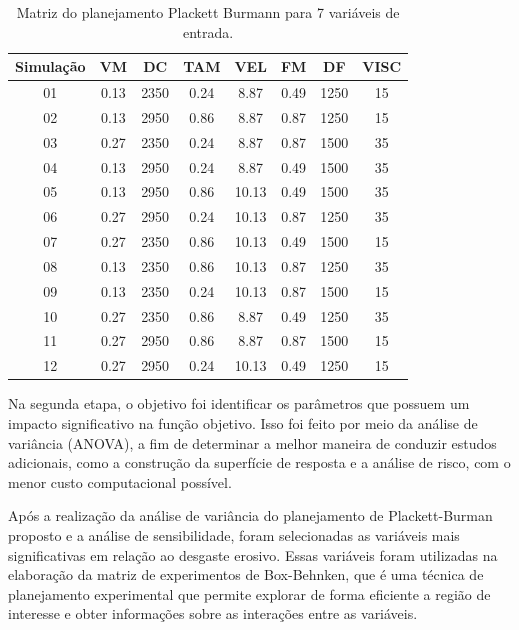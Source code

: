 \begin{table}[H] 
\caption{Matriz do planejamento Plackett Burmann para 7 variáveis de entrada.}
\begin{tabular*}{\textwidth}{@{\extracolsep{\stretch{1}}}*{8}{c}@{}}
\toprule
   Simulação &VM&	DC	&TAM	&VEL&	FM&	DF	&VISC\\
  \midrule
01 & 0.13 &	2350 &	0.24	& 8.87   &	0.49 &	1250 &	15 	\\
02 & 0.13 &	2950 &	0.86	& 8.87  &	0.87 &	1250 &	15 	\\
03 & 0.27 &	2350 &	0.24	& 8.87  &	0.87 &	1500 &	35   \\
04 & 0.13 &	2950&	0.24	& 8.87   &	0.49 &	1500 &	35    \\
05 & 0.13 &	2950 &	0.86	& 10.13  &	0.49 &	1500 &	35     \\
06 & 0.27 &	2950 &	0.24	& 10.13	 &  0.87 &	1250 &	35     \\
07 & 0.27 &	2350 &	0.86	& 10.13	 &  0.49 &	1500 &	15 	\\
08 & 0.13 &	2350 &	0.86	& 10.13 &  0.87 &	1250 &	35 	\\
09 & 0.13 &	2350 &	0.24	& 10.13	 &  0.87 &	1500&	15 	\\
10 & 0.27 &	2350 &	0.86	& 8.87	 &  0.49 &	1250&	35 	\\
11 & 0.27 &	2950 &	0.86	& 8.87	 &  0.87 &	1500&	15 	\\
12 & 0.27 &	2950 &	0.24    & 10.13	 &  0.49 &	1250 &	15	\\

\bottomrule   
\end{tabular*}
\label{tab:box4}
\label {tab:placket7var}
\end{table}

Na segunda etapa, o objetivo foi identificar os parâmetros que possuem um impacto significativo na função objetivo. Isso foi feito por meio da análise de variância (ANOVA), a fim de determinar a melhor maneira de conduzir estudos adicionais, como a construção da superfície de resposta e a análise de risco, com o menor custo computacional possível.

Após a realização da análise de variância do planejamento de Plackett-Burman proposto e a análise de sensibilidade, foram selecionadas as variáveis mais significativas em relação ao desgaste erosivo. Essas variáveis foram utilizadas na elaboração da matriz de experimentos de Box-Behnken, que é uma técnica de planejamento experimental que permite explorar de forma eficiente a região de interesse e obter informações sobre as interações entre as variáveis.

